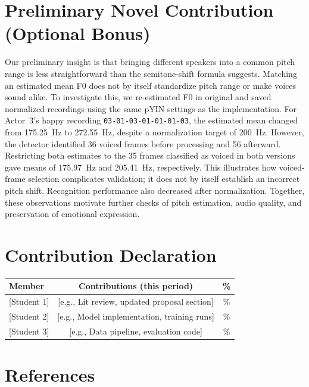 \documentclass[11pt, letterpaper]{article}
\begin{document}
\section{Preliminary Novel Contribution (Optional Bonus)}

Our preliminary insight is that bringing different speakers into a common pitch range is less straightforward than the semitone-shift formula suggests. Matching an estimated mean F0 does not by itself standardize pitch range or make voices sound alike. To investigate this, we re-estimated F0 in original and saved normalized recordings using the same pYIN settings as the implementation. For Actor~3's happy recording \texttt{03-01-03-01-01-01-03}, the estimated mean changed from 175.25~Hz to 272.55~Hz, despite a normalization target of 200~Hz. However, the detector identified 36 voiced frames before processing and 56 afterward. Restricting both estimates to the 35 frames classified as voiced in both versions gave means of 175.97~Hz and 205.41~Hz, respectively. This illustrates how voiced-frame selection complicates validation; it does not by itself establish an incorrect pitch shift. Recognition performance also decreased after normalization. Together, these observations motivate further checks of pitch estimation, audio quality, and preservation of emotional expression.

\section{Contribution Declaration}

\begin{tabular}{lcc}
\toprule
\textbf{Member} & \textbf{Contributions (this period)} & \textbf{\%} \\
\midrule
{[Student 1]} & [e.g., Lit review, updated proposal section] & \% \\
{[Student 2]} & [e.g., Model implementation, training runs] & \% \\
{[Student 3] }& [e.g., Data pipeline, evaluation code] & \% \\
\bottomrule
\end{tabular}

\section{References}

\begin{enumerate}[label={[\arabic*]},leftmargin=*]
  \item [Author(s), Year. ``Title.'' \textit{Venue}. arXiv:XXXX.XXXXX]
  \item [\ldots]
\end{enumerate}
\end{document}
